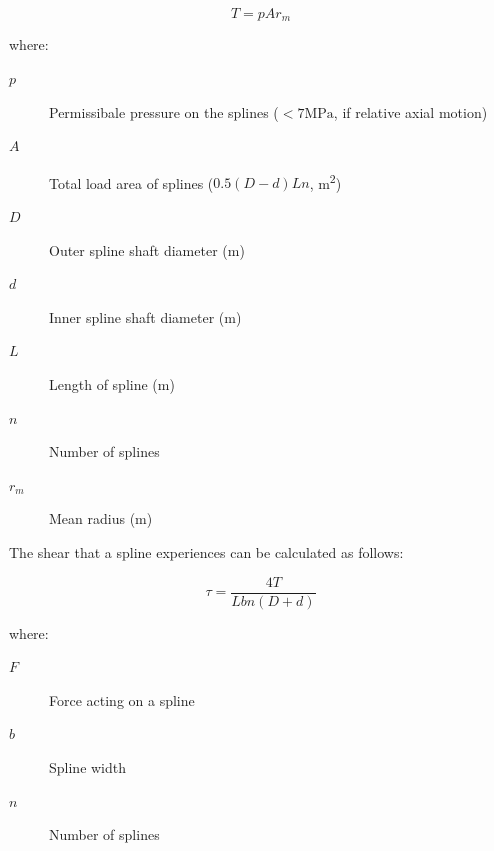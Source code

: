 \begin{equation}
    T=pAr_m
\end{equation}

\noindent where:

\begin{description}
    \item[\( p \)] Permissibale pressure on the splines (\(<7\si{\mega\pascal}\), if relative axial motion)
    \item[\(A\)] Total load area of splines (\(0.5(D-d)Ln\), \si{\metre^2})
    \item[\(D\)] Outer spline shaft diameter (\si{\metre})
    \item[\(d\)] Inner spline shaft diameter (\si{\metre})
    \item[\(L\)] Length of spline (\si{\metre})
    \item[\(n\)] Number of splines
    \item[\(r_m\)] Mean radius (\si{\metre})
\end{description}

The shear that a spline experiences can be calculated as follows:

\begin{equation}
    \tau = \frac{4T}{Lbn(D+d)}
\end{equation}

where:

\begin{description}
    \item[\( F \)] Force acting on a spline 
    \item[\( b \)] Spline width
    \item[\( n \)] Number of splines
\end{description}









